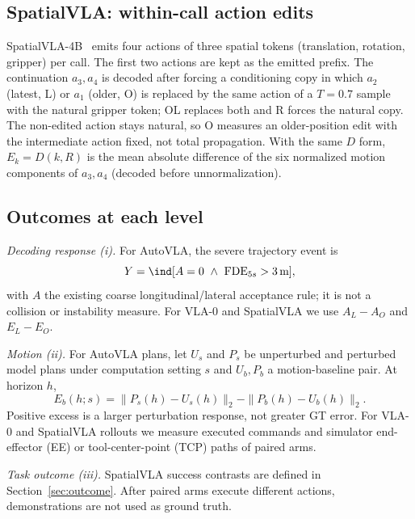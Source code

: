 \subsection{SpatialVLA: within-call action edits}
SpatialVLA-4B~\cite{qu2025spatialvla} emits four actions of three spatial tokens (translation, rotation, gripper) per call. The first two actions are kept as the emitted prefix. The continuation $a_3,a_4$ is decoded after forcing a conditioning copy in which $a_2$ (latest, L) or $a_1$ (older, O) is replaced by the same action of a $T{=}0.7$ sample with the natural gripper token; OL replaces both and R forces the natural copy. The non-edited action stays natural, so O measures an older-position edit with the intermediate action fixed, not total propagation. With the same $D$ form, $E_k=D(k,R)$ is the mean absolute difference of the six normalized motion components of $a_3,a_4$ (decoded before unnormalization).

\subsection{Outcomes at each level}
\emph{Decoding response (i).} For AutoVLA, the severe trajectory event is
\begin{equation}
Y=\ind[A=0\ \land\ \mathrm{FDE}_{5s}>3\,\mathrm m],
\end{equation}
with $A$ the existing coarse longitudinal/lateral acceptance rule; it is not a collision or instability measure. For VLA-0 and SpatialVLA we use $A_L-A_O$ and $E_L-E_O$.

\emph{Motion (ii).} For AutoVLA plans, let $U_s$ and $P_s$ be unperturbed and perturbed model plans under computation setting $s$ and $U_b,P_b$ a motion-baseline pair. At horizon $h$,
\begin{equation}
E_b(h;s)=\|P_s(h)-U_s(h)\|_2-\|P_b(h)-U_b(h)\|_2 .
\end{equation}
Positive excess is a larger perturbation response, not greater GT error. For VLA-0 and SpatialVLA rollouts we measure executed commands and simulator end-effector (EE) or tool-center-point (TCP) paths of paired arms.

\emph{Task outcome (iii).} SpatialVLA success contrasts are defined in Section~\ref{sec:outcome}. After paired arms execute different actions, demonstrations are not used as ground truth.


